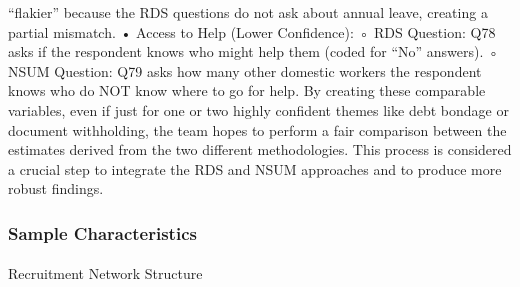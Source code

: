 \documentclass[
  12pt,
  letterpaper,
  DIV=11,
  numbers=noendperiod]{scrartcl}
\makeatletter
\let\oldparagraph\paragraph
\renewcommand{\paragraph}{
    \@ifstar
      \xxxParagraphStar
      \xxxParagraphNoStar
  }
\newcommand{\xxxParagraphStar}[1]{\oldparagraph*{#1}\mbox{}}
\newcommand{\xxxParagraphNoStar}[1]{\oldparagraph{#1}\mbox{}}
\theoremstyle{plain}
\theoremstyle{definition}
\makeatother
\begin{document}
{``flakier'' because the RDS questions do not ask about annual leave,
creating a partial mismatch. • Access to Help (Lower Confidence): ◦ RDS
Question: Q78 asks if the respondent knows who might help them (coded
for ``No'' answers). ◦ NSUM Question: Q79 asks how many other domestic
workers the respondent knows who do NOT know where to go for help. By
creating these comparable variables, even if just for one or two highly
confident themes like debt bondage or document withholding, the team
hopes to perform a fair comparison between the estimates derived from
the two different methodologies. This process is considered a crucial
step to integrate the RDS and NSUM approaches and to produce more robust
findings.

\subsubsection{Sample Characteristics}\label{sample-characteristics}

\paragraph{Recruitment Network
Structure}\label{recruitment-network-structure}

\begin{table}

\caption{\label{tbl-network}RDS Sample Network Characteristics}

\end{table}}
\end{document}

